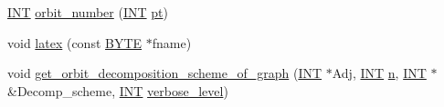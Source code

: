 \begin{DoxyCompactItemize}
\item 
\mbox{\hyperlink{galois_8h_a09fddde158a3a20bd2dcadb609de11dc}{I\+NT}} \mbox{\hyperlink{classschreier_a65ae0e0466545deba181b987c27feb58}{orbit\+\_\+number}} (\mbox{\hyperlink{galois_8h_a09fddde158a3a20bd2dcadb609de11dc}{I\+NT}} \mbox{\hyperlink{clique__finder_8_c_aec1f1a2b30fdca8844c2932384483145}{pt}})
\item 
void \mbox{\hyperlink{classschreier_aff94ed06d8ca33cb26accd435d525ea2}{latex}} (const \mbox{\hyperlink{galois_8h_ab6cc7b4aeb6ea31aba2b3fbfc83ff5e6}{B\+Y\+TE}} $\ast$fname)
\item 
void \mbox{\hyperlink{classschreier_afe5e69fc0b320432e9d93e94853b22d2}{get\+\_\+orbit\+\_\+decomposition\+\_\+scheme\+\_\+of\+\_\+graph}} (\mbox{\hyperlink{galois_8h_a09fddde158a3a20bd2dcadb609de11dc}{I\+NT}} $\ast$Adj, \mbox{\hyperlink{galois_8h_a09fddde158a3a20bd2dcadb609de11dc}{I\+NT}} \mbox{\hyperlink{simeon_8_c_a7f2cd26777ce0ff3fdaf8d02aacbddfb}{n}}, \mbox{\hyperlink{galois_8h_a09fddde158a3a20bd2dcadb609de11dc}{I\+NT}} $\ast$\&Decomp\+\_\+scheme, \mbox{\hyperlink{galois_8h_a09fddde158a3a20bd2dcadb609de11dc}{I\+NT}} \mbox{\hyperlink{simeon_8_c_a818073fbcc2f439e7c56952f67386122}{verbose\+\_\+level}})
\end{DoxyCompactItemize}
